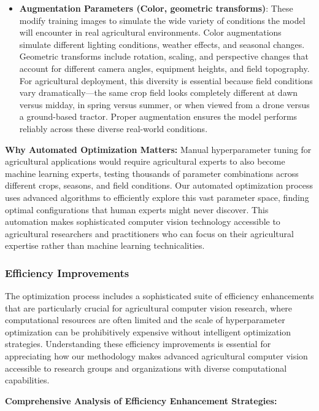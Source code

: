 \begin{itemize}
    \item \textbf{Augmentation Parameters (Color, geometric transforms)}: These modify training images to simulate the wide variety of conditions the model will encounter in real agricultural environments. Color augmentations simulate different lighting conditions, weather effects, and seasonal changes. Geometric transforms include rotation, scaling, and perspective changes that account for different camera angles, equipment heights, and field topography. For agricultural deployment, this diversity is essential because field conditions vary dramatically—the same crop field looks completely different at dawn versus midday, in spring versus summer, or when viewed from a drone versus a ground-based tractor. Proper augmentation ensures the model performs reliably across these diverse real-world conditions.
\end{itemize}

\textbf{Why Automated Optimization Matters:} Manual hyperparameter tuning for agricultural applications would require agricultural experts to also become machine learning experts, testing thousands of parameter combinations across different crops, seasons, and field conditions. Our automated optimization process uses advanced algorithms to efficiently explore this vast parameter space, finding optimal configurations that human experts might never discover. This automation makes sophisticated computer vision technology accessible to agricultural researchers and practitioners who can focus on their agricultural expertise rather than machine learning technicalities.

\subsubsection{Efficiency Improvements}

The optimization process includes a sophisticated suite of efficiency enhancements that are particularly crucial for agricultural computer vision research, where computational resources are often limited and the scale of hyperparameter optimization can be prohibitively expensive without intelligent optimization strategies. Understanding these efficiency improvements is essential for appreciating how our methodology makes advanced agricultural computer vision accessible to research groups and organizations with diverse computational capabilities.

\textbf{Comprehensive Analysis of Efficiency Enhancement Strategies:}

